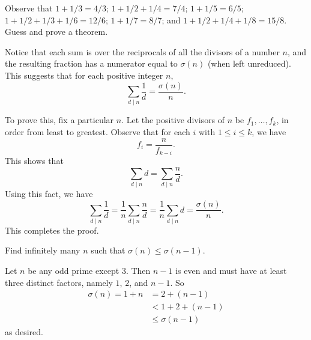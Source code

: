  Observe that $1 + 1/3 = 4/3$; $1 + 1/2 + 1/4 = 7/4$;
$1 + 1/5 = 6/5$; $1 + 1/2 + 1/3 + 1/6 = 12/6$; $1 + 1/7 = 8/7$; and
$1 + 1/2 + 1/4 + 1/8 = 15/8$. Guess and prove a theorem.
\begin{solution}
  Notice that each sum is over the reciprocals of all the divisors of
  a number $n$, and the resulting fraction has a numerator equal to
  $\sigma(n)$ (when left unreduced). This suggests that for each
  positive integer $n$,
  \begin{equation*}
    \sum_{d\mid n}\frac1d = \frac{\sigma(n)}n.
  \end{equation*}

  To prove this, fix a particular $n$. Let the positive divisors of
  $n$ be $f_1,\dots,f_k$, in order from least to greatest. Observe
  that for each $i$ with $1\leq i\leq k$, we have
  \begin{equation*}
    f_i = \frac{n}{f_{k-i}}.
  \end{equation*}
  This shows that
  \begin{equation*}
    \sum_{d\mid n}d = \sum_{d\mid n}\frac{n}d.
  \end{equation*}
  Using this fact, we have
  \begin{equation*}
    \sum_{d\mid n}\frac1d = \frac1n\sum_{d\mid n}\frac{n}d
    = \frac1n\sum_{d\mid n}d
    = \frac{\sigma(n)}n.
  \end{equation*}
  This completes the proof.
\end{solution}

 Find infinitely many $n$ such that
$\sigma(n) \leq \sigma(n - 1)$.
\begin{solution}
  Let $n$ be any odd prime except $3$. Then $n - 1$ is even and must
  have at least three distinct factors, namely $1$, $2$, and $n-1$. So
  \begin{align*}
    \sigma(n) = 1 + n &= 2 + (n - 1) \\
                      &< 1 + 2 + (n - 1) \\
                      &\leq \sigma(n - 1)
  \end{align*}
  as desired.
\end{solution}

